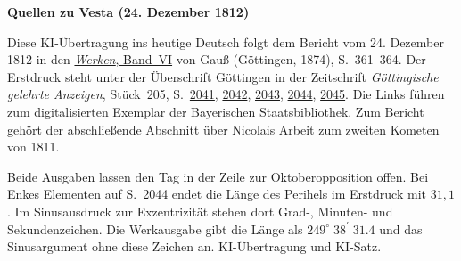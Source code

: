 \clearpage\thispagestyle{empty}
\begin{center}\textbf{Quellen zu Vesta (24. Dezember 1812)}\end{center}
\noindent Diese KI-Übertragung ins heutige Deutsch folgt dem Bericht vom 24. Dezember 1812 in den \href{https://gdz.sub.uni-goettingen.de/id/PPN236007467}{\textit{Werken}, Band~VI} von Gauß (Göttingen, 1874), S.~361--364. Der Erstdruck steht unter der Überschrift Göttingen in der Zeitschrift \textit{Göttingische gelehrte Anzeigen}, Stück~205, S.~\href{https://api.digitale-sammlungen.de/iiif/image/v2/bsb10538682_01007/full/1600,/0/default.jpg}{2041}, \href{https://api.digitale-sammlungen.de/iiif/image/v2/bsb10538682_01008/full/1600,/0/default.jpg}{2042}, \href{https://api.digitale-sammlungen.de/iiif/image/v2/bsb10538682_01009/full/1600,/0/default.jpg}{2043}, \href{https://api.digitale-sammlungen.de/iiif/image/v2/bsb10538682_01010/full/1600,/0/default.jpg}{2044}, \href{https://api.digitale-sammlungen.de/iiif/image/v2/bsb10538682_01011/full/1600,/0/default.jpg}{2045}. Die Links führen zum digitalisierten Exemplar der Bayerischen Staatsbibliothek. Zum Bericht gehört der abschließende Abschnitt über Nicolais Arbeit zum zweiten Kometen von 1811.
\par\smallskip\noindent Beide Ausgaben lassen den Tag in der Zeile zur Oktoberopposition offen. Bei Enkes Elementen auf S.~2044 endet die Länge des Perihels im Erstdruck mit $31{,}1$. Im Sinusausdruck zur Exzentrizität stehen dort Grad-, Minuten- und Sekundenzeichen. Die Werkausgabe gibt die Länge als $249^\circ\;38^{\prime}\;31.4$ und das Sinusargument ohne diese Zeichen an. KI-Übertragung und KI-Satz.
\clearpage
